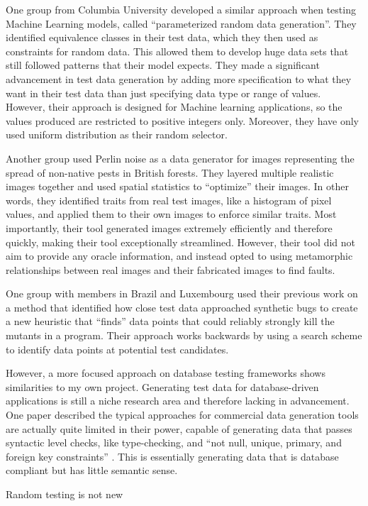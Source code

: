One group from Columbia University developed a similar approach when testing Machine Learning models, called ``parameterized random data generation''. They identified equivalence classes in their test data, which they then used as constraints for random data. This allowed them to develop huge data sets that still followed patterns that their model expects. They made a significant advancement in test data generation by adding more specification to what they want in their test data than just specifying data type or range of values. However, their approach is designed for Machine learning applications, so the values produced are restricted to positive integers only. Moreover, they have only used uniform distribution as their random selector.

Another group used Perlin noise as a data generator for images representing the spread of non-native pests in British forests. They layered multiple realistic images together and used spatial statistics to ``optimize'' their images. In other words, they identified traits from real test images, like a histogram of pixel values, and applied them to their own images to enforce similar traits. Most importantly, their tool generated images extremely efficiently and therefore quickly, making their tool exceptionally streamlined. However, their tool did not aim to provide any oracle information, and instead opted to using metamorphic relationships between real images and their fabricated images to find faults.

One group with members in Brazil and Luxembourg used their previous work on a method that identified how close test data approached synthetic bugs to create a new heuristic that ``finds'' data points that could reliably strongly kill the mutants in a program. Their approach works backwards by using a search scheme to identify data points at potential test candidates.

However, a more focused approach on database testing frameworks shows similarities to my own project. Generating test data for database-driven applications is still a niche research area and therefore lacking in advancement. One paper described the typical approaches for commercial data generation tools are actually quite limited in their power, capable of generating data that passes syntactic level checks, like type-checking, and ``not null, unique, primary, and foreign key constraints'' . This is essentially generating data that is database compliant but has little semantic sense.

Random testing is not new~\cite{Hughes:2016:FMB:2896921.2896928}